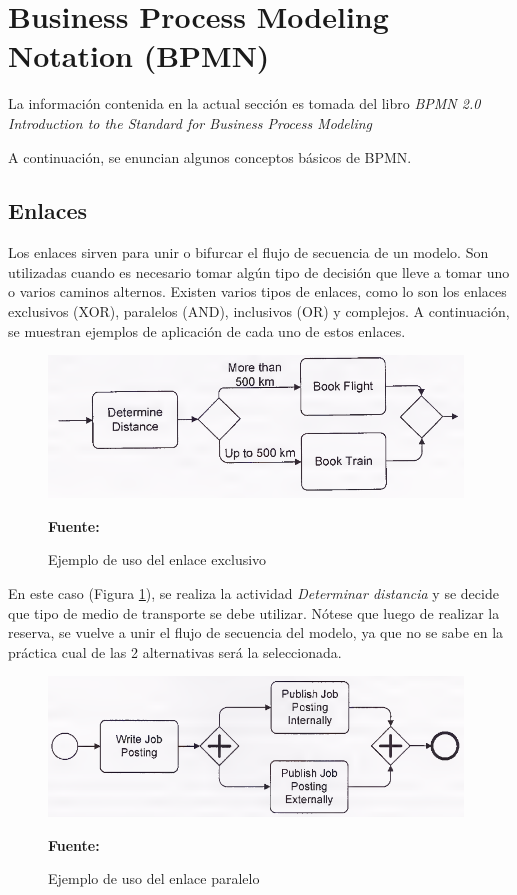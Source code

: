 \section{Business Process Modeling Notation (BPMN)}

La información contenida en la actual sección es tomada del libro \textit{BPMN 2.0 Introduction to the Standard for Business Process Modeling} \cite{bpmn2}

A continuación, se enuncian algunos conceptos básicos de BPMN.

\subsection{Enlaces}

Los enlaces sirven para unir o bifurcar el flujo de secuencia de un modelo. Son utilizadas cuando es necesario tomar algún tipo de decisión que lleve a tomar uno o varios caminos alternos. Existen varios tipos de enlaces, como lo son los enlaces exclusivos (XOR), paralelos (AND), inclusivos (OR) y complejos. A continuación, se muestran ejemplos de aplicación de cada uno de estos enlaces.

\begin{figure}[!htb]
  \begin{center}
    \includegraphics[width=11cm]{./imagenes/gateway_exclusivo.png}
    \caption{Ejemplo de uso del enlace exclusivo}
    \label{fig:gateway_exclusivo}
    \textbf{Fuente:}  \cite{bpmn2}
  \end{center}
\end{figure}

En este caso (Figura \ref{fig:gateway_exclusivo}), se realiza la actividad \textit{Determinar distancia} y se decide que tipo de medio de transporte se debe utilizar. Nótese que luego de realizar la reserva, se vuelve a unir el flujo de secuencia del modelo, ya que no se sabe en la práctica cual de las 2 alternativas será la seleccionada.

\begin{figure}[!htb]
  \begin{center}
    \includegraphics[width=11cm]{./imagenes/gateway_paralelo.png}
    \caption{Ejemplo de uso del enlace paralelo}
    \label{fig:gateway_paralelo}
    \textbf{Fuente:}  \cite{bpmn2}
  \end{center}
\end{figure}

